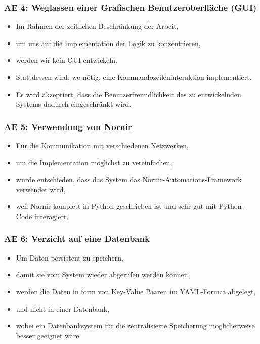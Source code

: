 \documentclass[
	ngerman,
	toc=listof, %
	toc=bibliography, %
	footnotes=multiple, %
	parskip=half, %
	numbers=noendperiod %
]{scrartcl}
\begin{document}
		\subsubsection{AE 4: Weglassen einer Grafischen Benutzeroberfläche (GUI)}
		\begin{itemize}
			\item Im Rahmen der zeitlichen Beschränkung der Arbeit,
			\item um uns auf die Implementation der Logik zu konzentrieren,
			\item werden wir kein GUI entwickeln.
			\item Stattdessen wird, wo nötig, eine Kommandozeileninteraktion implementiert.
			\item Es wird akzeptiert, dass die Benutzerfreundlichkeit des zu entwickelnden Systems dadurch eingeschränkt wird.
		\end{itemize}

		\subsubsection{AE 5: Verwendung von Nornir}
		\begin{itemize}
			\item Für die Kommunikation mit verschiedenen Netzwerken,
			\item um die Implementation möglichst zu vereinfachen,
			\item wurde entschieden, dass das System das Nornir-Automations-Framework verwendet wird,
			\item weil Nornir komplett in Python geschrieben ist und sehr gut mit Python-Code interagiert.
		\end{itemize}

		\subsubsection{AE 6: Verzicht auf eine Datenbank}
		\begin{itemize}
			\item Um Daten persistent zu speichern, 
			\item damit sie vom System wieder abgerufen werden können,
			\item werden die Daten in form von Key-Value Paaren im YAML-Format abgelegt,
			\item und nicht in einer Datenbank,
			\item wobei ein Datenbanksystem für die zentralisierte Speicherung möglicherweise besser geeignet wäre.
		\end{itemize}
		\newpage
\end{document}
